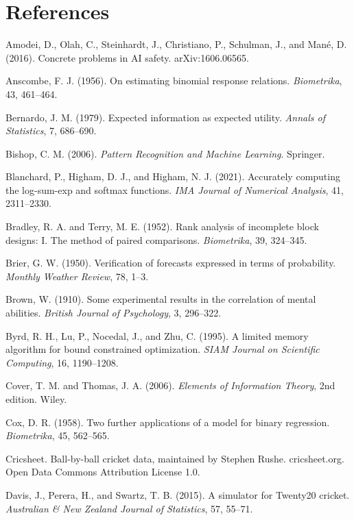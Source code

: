 \documentclass[11pt,letterpaper]{article}
\begin{document}
\section*{References}
\begin{footnotesize}
\begin{enumerate}[leftmargin=1.6em, itemsep=1pt, label={[\arabic*]}]
\item Amodei, D., Olah, C., Steinhardt, J., Christiano, P., Schulman, J., and Man\'e, D. (2016). Concrete problems in AI safety. arXiv:1606.06565.
\item Anscombe, F. J. (1956). On estimating binomial response relations. \emph{Biometrika}, 43, 461--464.
\item Bernardo, J. M. (1979). Expected information as expected utility. \emph{Annals of Statistics}, 7, 686--690.
\item Bishop, C. M. (2006). \emph{Pattern Recognition and Machine Learning}. Springer.
\item Blanchard, P., Higham, D. J., and Higham, N. J. (2021). Accurately computing the log-sum-exp and softmax functions. \emph{IMA Journal of Numerical Analysis}, 41, 2311--2330.
\item Bradley, R. A. and Terry, M. E. (1952). Rank analysis of incomplete block designs: I. The method of paired comparisons. \emph{Biometrika}, 39, 324--345.
\item Brier, G. W. (1950). Verification of forecasts expressed in terms of probability. \emph{Monthly Weather Review}, 78, 1--3.
\item Brown, W. (1910). Some experimental results in the correlation of mental abilities. \emph{British Journal of Psychology}, 3, 296--322.
\item Byrd, R. H., Lu, P., Nocedal, J., and Zhu, C. (1995). A limited memory algorithm for bound constrained optimization. \emph{SIAM Journal on Scientific Computing}, 16, 1190--1208.
\item Cover, T. M. and Thomas, J. A. (2006). \emph{Elements of Information Theory}, 2nd edition. Wiley.
\item Cox, D. R. (1958). Two further applications of a model for binary regression. \emph{Biometrika}, 45, 562--565.
\item Cricsheet. Ball-by-ball cricket data, maintained by Stephen Rushe. cricsheet.org. Open Data Commons Attribution License 1.0.
\item Davis, J., Perera, H., and Swartz, T. B. (2015). A simulator for Twenty20 cricket. \emph{Australian \& New Zealand Journal of Statistics}, 57, 55--71.

\end{enumerate}
\end{footnotesize}
\end{document}
